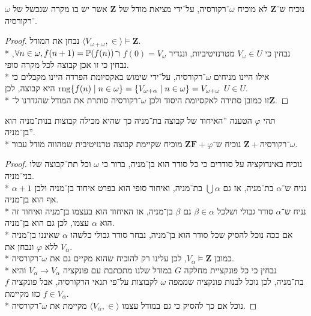 \Subquestion{}
נוכיח ש־$\textbf{Z}$ לא מוכיח $\omega$־רקורסיה, על־ידי מציאת מודל של $\textbf{Z}$ אשר יש בו מקרה שנכשל של $\omega$־רקורסיה.
\begin{proof}
	נבחן את המודל $\langle V_{\omega + \omega}, \in \rangle \models \textbf{Z}$. \\*
	נבחין כי $V_\omega \in U$ מטרנזיטיביות, ונגדיר $f(0) = V_\omega$ ו־$\forall n \in \omega, f(n + 1) = \mathbb{P}(f(n))$, נבחין כי זו אכן קבוצה לכל מקרה סופי. \\*
	אילו היינו מניחים $\omega$־רקורסיה, על־ידי שימוש באקסיומת הפרדה היינו מקבלים כי $\operatorname{rng}\{ f(n) \mid n \in \omega\} = \{ V_{\omega + \alpha} \mid n \in \omega \} = V_{\omega + \omega}$ היא קבוצה, לכן $U \in U$. \\*
	זו כמובן סתירה לאקסיומת היסוד ולכן $\omega$־רקורסיה סותרת את המודל שהגדרנו ל־$\textbf{Z}$.
\end{proof}

\Subquestion{}
תהי $\varphi$ הטענה ''האיחוד של קבוצה בת־מניה כך שהיא מכילה קבוצות בנות־מניה הוא בן־מניה''. \\*
נוכיח ש־$\textbf{ZF} + \varphi$ מוכיח שקיימת קבוצה טרנזיטיבית שמהווה מודל עבור $\textbf{Z} + \text{־רקורסיה}\omega$.
\begin{proof}
	נוכיח באינדוקציה על סודרים כי כל סודר הוא בן־מניה, ברור כי $\omega$ וכל תת־קבוצה שלו בני־מניה. \\*
	נניח ש־$\alpha$ בת־מניה, אז גם $\bigcup \alpha$ בת־מניה, ואיחוד סופי הוא בפרט איחוד בן־מניה ולכן $\alpha + 1$ אף הוא בן־מניה. \\*
	נניח ש־$\alpha$ סודר גבולי ושלכל $\beta \in \alpha$ גם $\beta$ בן־מניה, אז האיחוד הוא בעצמו בן־מניה ואיחוד זה הוא $\alpha$ עצמו, לכן גם הוא בן־מניה. \\*
	אם ככה נוכל להסיק שכל סודר הוא בן־מניה, נבחר סודר גבולי כלשהו $\alpha$ שאיננו בן־מניה ללא $\varphi$ ונבחן את $V_\alpha$. \\*
	כמובן $V_\alpha \models \textbf{Z}$, לכן עלינו רק להוכיח שהוא מקיים גם את $\omega$־רקורסיה. \\*
	נבחין כי כל פונקציית מחלקה $G$ במודל שלנו מתכתבת עם פונקציה $V_\alpha \to V_\alpha$ והיא בת־מניה, לכן נוכל לבנות פונקציה שממפה $\omega$ לקבוצות על־פי תנאי הרקורסיה, אבל פונקציה $f$ כזו מקיימת $f \in V_\alpha$. \\*
	נוכל אם כך להסיק כי גם במודל עצמו $\langle V_\alpha, \in \rangle$ מקיימת את $\omega$־רקורסיה.
\end{proof}

